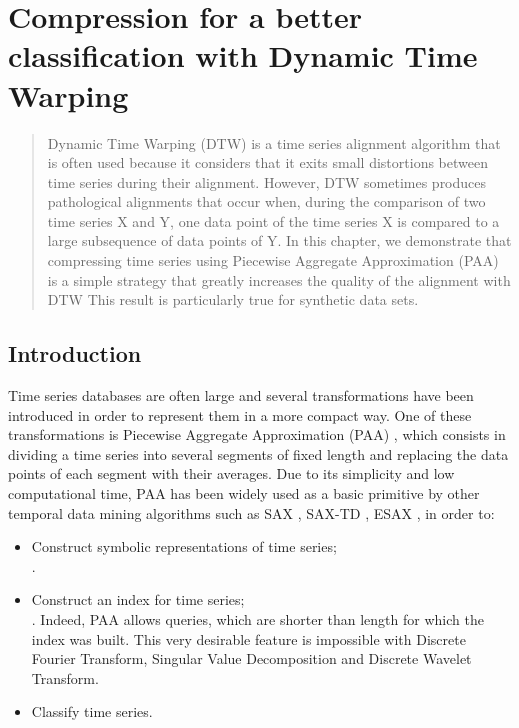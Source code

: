 \chapter[Preprocessing of time series]{Compression for a better classification with Dynamic Time Warping}
\label{fdtw}

\begin{abstract}
 Dynamic Time Warping (DTW) is a time series alignment algorithm that is often used because it
 considers that it exits small distortions between time series during their alignment.  However, DTW
 sometimes produces pathological alignments that occur when, during the comparison of two time series
 X and Y, one data point of the time series X is compared to a large subsequence of data points of Y.
 In this chapter, we demonstrate that  compressing time series using Piecewise Aggregate Approximation
 (PAA) is a simple strategy that greatly increases the quality of the alignment with DTW This result is 
 particularly true for synthetic data sets.      
 \end{abstract}

\section{Introduction}
%


Time series databases are often large and several transformations have been
introduced in order to represent them in a more compact way. One of these transformations is
Piecewise Aggregate Approximation (PAA) \cite{keogh2001dimensionality}, which consists in dividing a
time series into several segments of fixed length and replacing the data points of each segment with
their averages. Due to its simplicity and low computational time, PAA has been widely used as a
basic primitive by other temporal data mining algorithms such as SAX \cite{lin2003symbolic}, SAX-TD \cite{sun2014improvement}, ESAX  \cite{lkhagva2006extended}, in order to: 
\begin{itemize}
  \item Construct symbolic representations of time
series; \cite{camerra2010isax} \\ \cite{ulanova2015scalable}.
  \item Construct an index for time series; \cite{zhao2016shapedtw} \\ \cite{keogh2000scaling}  \cite{Kate2016}. Indeed, PAA allows queries, which are shorter than length for which the
index was built. This very desirable feature is impossible with Discrete Fourier Transform, Singular
Value Decomposition and Discrete Wavelet Transform.
\item Classify time series.
\end{itemize}


